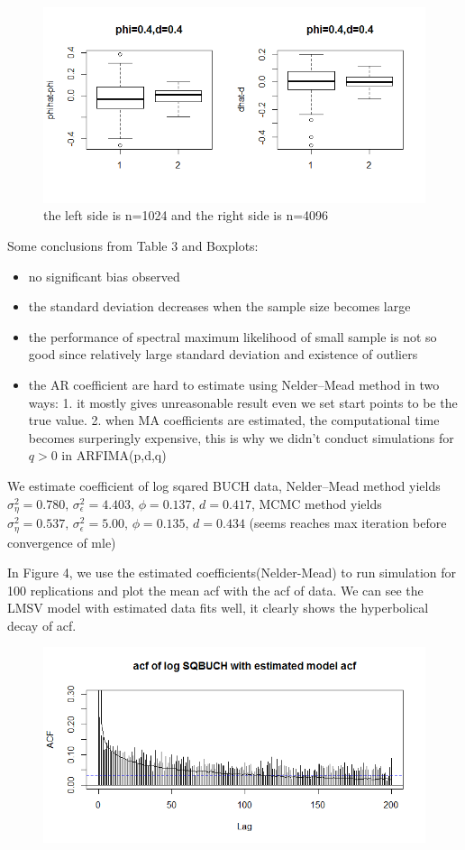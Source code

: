 \documentclass[10pt,a4paper]{article}
\begin{document}
\begin{figure}[!htb]
\centering
\includegraphics[width=14.5cm]{Rplot02}
\caption{the left side is n=1024 and the right side is n=4096}
\end{figure}
Some conclusions from Table 3 and Boxplots:
\begin{itemize}
\item {no significant bias observed }
\item {the standard deviation decreases when the sample size becomes large}
\item {the performance of spectral maximum likelihood of small sample is not so good since relatively large standard deviation and existence of outliers }
\item {the AR coefficient are hard to estimate using Nelder–Mead method in two ways: 1. it mostly gives unreasonable result even we set start points to be the true value. 2. when MA coefficients are estimated, the computational time becomes surperingly expensive, this is why we didn't conduct simulations for $q>0$ in ARFIMA(p,d,q)}
\end{itemize}

We estimate coefficient of log sqared BUCH data, Nelder–Mead method yields $\sigma_\eta^2=0.780,\, \sigma_\epsilon^2=4.403,\,\phi= 0.137,\,d=0.417$, MCMC method yields $ \sigma_\eta^2=0.537,\, \sigma_\epsilon^2=5.00,\,\phi= 0.135,\,d=0.434 $ (seems reaches max iteration before convergence of mle)

In Figure 4, we use the estimated coefficients(Nelder-Mead) to run simulation for 100 replications and plot the mean acf with the acf of data. We can see the LMSV model with estimated data fits well, it clearly shows the hyperbolical decay of acf.
\begin{figure}[!htb]
\centering
\includegraphics[width=14.5cm]{Rplot3}
\caption{}
\end{figure}
\end{document}
